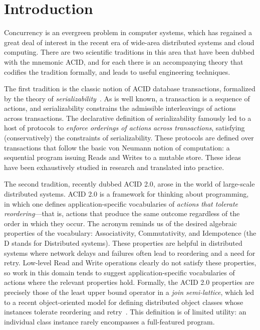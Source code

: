 \documentclass{sig-alternate}
\begin{document}
\section{Introduction}
Concurrency is an evergreen problem in computer systems, which has regained a
great deal of interest in the recent era of wide-area distributed systems and
cloud computing.  There are two scientific traditions in this area that have
been dubbed with the mnemonic \textsf{ACID}, and for each there is an
accompanying theory that codifies the tradition formally, and leads to useful
engineering techniques.

The first tradition is the classic notion of \textsf{ACID} database
transactions, formalized by the theory of \emph{serializability}~\cite{Papadimitriou1979}.
As is well known, a transaction is a sequence of actions, and serializability
constrains the admissible interleavings of actions across transactions.  The
declarative definition of serializability famously led to a host of protocols to
\emph{enforce orderings of actions across transactions}, satisfying
(conservatively) the constraints of serializability.  These protocols are
defined over transactions that follow the basic von Neumann notion of
computation: a sequential program issuing Reads and Writes to a mutable store.
These ideas have been exhaustively studied in research and translated into
practice.

The second tradition, recently dubbed \textsf{ACID 2.0}, arose in the world of
large-scale distributed systems.  ACID 2.0 is a framework for thinking about
programming, in which one defines application-specific vocabularies of
\emph{actions that tolerate reordering}---that is, actions that produce the same
outcome regardless of the order in which they occur.  The acronym reminds us of
the desired algebraic properties of the vocabulary: Associativity,
Commutativity, and Idempotence (the D stands for Distributed systems).  These
properties are helpful in distributed systems where network delays and failures
often lead to reordering and a need for retry. Low-level Read and Write
operations clearly do not satisfy these properties, so work in this domain tends
to suggest application-specific vocabularies of actions where the relevant
properties hold.  Formally, the ACID 2.0 properties are precisely those of the
least upper bound operator in a {\em join semi-lattice}, which led to a recent
object-oriented model for defining distributed object classes whose instances
tolerate reordering and retry~\cite{Shapiro2011a,Shapiro2011b}.  This definition
is of limited utility: an individual class instance rarely encompasses a
full-featured program.
\end{document}

